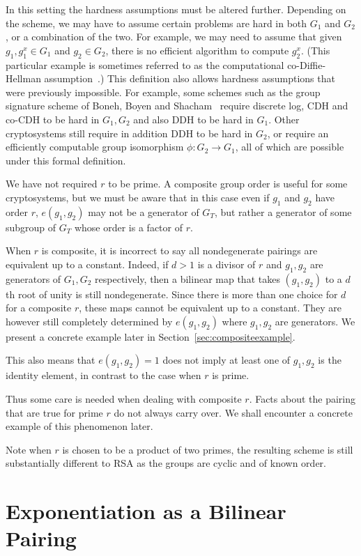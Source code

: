 In this setting the hardness assumptions must be altered further.
Depending on the scheme, we may have to assume certain problems are hard in
both $G_1$ and $G_2$, or a combination of the two. For example, we may
need to assume that given $g_1, g_1^x \in G_1$ and $g_2 \in G_2$,
there is no efficient algorithm to compute $g_2^x$. (This particular
example is sometimes referred to as
the computational co-Diffie-Hellman assumption~\cite{bls}.)
This definition also allows hardness assumptions that were previously
impossible. For example, some schemes such as the group signature scheme
of Boneh, Boyen and Shacham~\cite{bbs} require discrete log, CDH and
co-CDH to be hard in $G_1, G_2$ and also DDH to be hard in $G_1$.
Other cryptosystems still require in addition
DDH to be hard in $G_2$, or require an efficiently computable
group isomorphism $\phi:G_2 \rightarrow G_1$, all of which are possible
under this formal definition.

We have not required $r$ to be prime. A composite group
order is useful for some cryptosystems\cite{bgn},
but we must be aware that in this case even if $g_1$ and $g_2$ have order
$r$, $e(g_1, g_2)$ may not be a generator of $G_T$, but rather a generator
of some subgroup of $G_T$ whose order is a factor of $r$.

When $r$ is composite, it is incorrect to say all nondegenerate pairings are
equivalent up to a constant. Indeed, if $d > 1$ is a divisor of $r$
and $g_1, g_2$ are generators of $G_1, G_2$ respectively, then a bilinear map
that takes $(g_1, g_2)$ to a $d$th root of unity is still nondegenerate.
Since there is more than one choice for $d$ for a composite $r$,
these maps cannot be equivalent up to a constant. They are however still
completely determined by $e(g_1, g_2)$ where $g_1, g_2$ are generators.
We present a concrete example later in Section~\ref{sec:compositeexample}.

This also means that $e(g_1, g_2) = 1$ does not imply at least
one of $g_1, g_2$ is the identity element, in contrast to the case when
$r$ is prime.

Thus some care is needed when dealing with composite $r$.
Facts about the pairing that are true for prime $r$ do not always carry over.
We shall encounter a concrete example of this phenomenon later.

Note when $r$ is chosen to be a product of two primes, the resulting scheme
is still substantially different to RSA as the groups are cyclic and of
known order.

\section{Exponentiation as a Bilinear Pairing}

